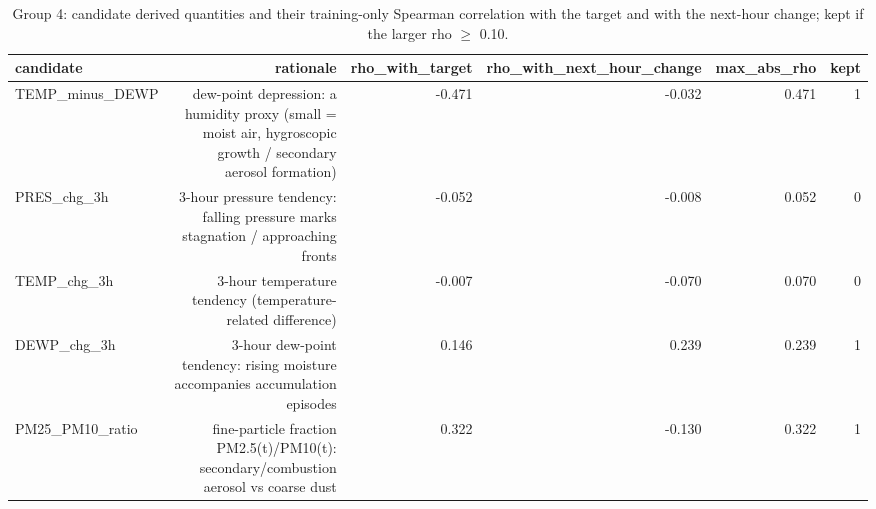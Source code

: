\begin{table}[t]
\centering
\small
\caption{Group 4: candidate derived quantities and their training-only Spearman correlation with the target and with the next-hour change; kept if the larger \textbar{}rho\textbar{} $\geq$ 0.10.}
\label{tab:table_S04_derived_feature_candidates}
\begin{tabular}{lrrrrr}
\toprule
candidate & rationale & rho\_with\_target & rho\_with\_next\_hour\_change & max\_abs\_rho & kept \\
\midrule
TEMP\_minus\_DEWP & dew-point depression: a humidity proxy (small = moist air, hygroscopic growth / secondary aerosol formation) & -0.471 & -0.032 & 0.471 & 1 \\
PRES\_chg\_3h & 3-hour pressure tendency: falling pressure marks stagnation / approaching fronts & -0.052 & -0.008 & 0.052 & 0 \\
TEMP\_chg\_3h & 3-hour temperature tendency (temperature-related difference) & -0.007 & -0.070 & 0.070 & 0 \\
DEWP\_chg\_3h & 3-hour dew-point tendency: rising moisture accompanies accumulation episodes & 0.146 & 0.239 & 0.239 & 1 \\
PM25\_PM10\_ratio & fine-particle fraction PM2.5(t)/PM10(t): secondary/combustion aerosol vs coarse dust & 0.322 & -0.130 & 0.322 & 1 \\
\bottomrule
\end{tabular}
\end{table}
